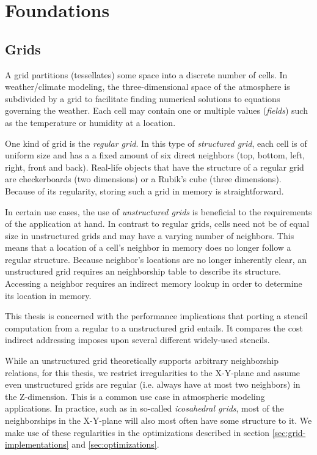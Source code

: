 \chapter{Foundations}									\label{sec:foundations}

\section{Grids}											\label{sec:grids}

A grid partitions (tessellates) some space into a discrete number of cells. In weather/climate modeling, the three-dimensional space of the atmosphere is subdivided by a grid to facilitate finding numerical solutions to equations governing the weather. Each cell may contain one or multiple values (\emph{fields}) such as the temperature or humidity at a location.

One kind of grid is the \emph{regular grid}. In this type of \emph{structured grid}, each cell is of uniform size and has a a fixed amount of six direct neighbors (top, bottom, left, right, front and back). Real-life objects that have the structure of a regular grid are checkerboards (two dimensions) or a Rubik's cube (three dimensions). Because of its regularity, storing such a grid in memory is straightforward.

In certain use cases, the use of \emph{unstructured grids} is beneficial to the requirements of the application at hand. In contrast to regular grids, cells need not be of equal size in unstructured grids and may have a varying number of neighbors. This means that a location of a cell's neighbor in memory does no longer follow a regular structure. Because neighbor's locations are no longer inherently clear, an unstructured grid requires an neighborship table to describe its structure. Accessing a neighbor requires an indirect memory lookup in order to determine its location in memory.

This thesis is concerned with the performance implications that porting a stencil computation from a regular to a unstructured grid entails. It compares the cost indirect addressing imposes upon several different widely-used stencils.

While an unstructured grid theoretically supports arbitrary neighborship relations, for this thesis, we restrict irregularities to the X-Y-plane and assume even unstructured grids are regular (i.e. always have at most two neighbors) in the Z-dimension. This is a common use case in atmospheric modeling applications. In practice, such as in so-called \emph{icosahedral grids}, most of the neighborships in the X-Y-plane will also most often have some structure to it. We make use of these regularities in the optimizations described in section \ref{sec:grid-implementations} and \ref{sec:optimizations}.


